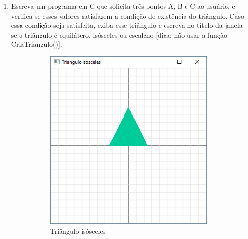 \begin{enumerate}
\begin{figure}[h!]
\end{figure}

\item

Escreva um programa em C que solicita três pontos A, B e C ao usuário, e verifica se esses valores satisfazem a condição de existência do triângulo. Caso essa condição seja satisfeita, exiba esse triângulo e escreva no título da janela se o triângulo é equilátero, isósceles ou escaleno [dica: não usar a função CriaTriangulo()].

  \begin{figure}[h!]
    \centering
    \begin{subfigure}[t]{0.3\textwidth}
        \centerline{\includegraphics[width=.9\textwidth]{img/cap1_ex23}}
        \caption{Triângulo isósceles}
        \label{fig:cap01_ex23a}
    \end{subfigure}
    ~
    \begin{subfigure}[t]{0.3\textwidth}

\end{subfigure}
\end{figure}
\end{enumerate}

